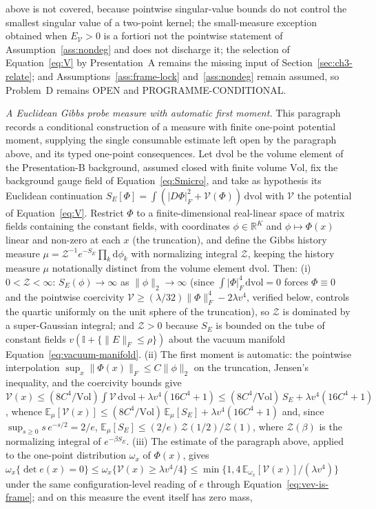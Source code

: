 above is not covered, because pointwise singular-value bounds do not control the smallest singular value of a two-point kernel; the small-measure exception obtained when \(E_{\mathcal V}>0\) is a fortiori not the pointwise statement of Assumption~\ref{ass:nondeg} and does not discharge it; the selection of Equation~\eqref{eq:V} by Presentation~A remains the missing input of Section~\ref{sec:ch3-relate}; and Assumptions~\ref{ass:frame-lock} and~\ref{ass:nondeg} remain assumed, so Problem~D remains OPEN and PROGRAMME-CONDITIONAL.

\emph{A Euclidean Gibbs probe measure with automatic first moment.} This paragraph records a conditional construction of a measure with finite one-point potential moment, supplying the single consumable estimate left open by the paragraph above, and its typed one-point consequences. Let \(\mathrm{dvol}\) be the volume element of the Presentation-B background, assumed closed with finite volume \(\mathrm{Vol}\), fix the background gauge field of Equation~\eqref{eq:Smicro}, and take as hypothesis its Euclidean continuation \(S_E[\Phi]=\int(\lvert D\Phi\rvert_F^2+\mathcal V(\Phi))\,\mathrm{dvol}\) with \(\mathcal V\) the potential of Equation~\eqref{eq:V}. Restrict \(\Phi\) to a finite-dimensional real-linear space of matrix fields containing the constant fields, with coordinates \(\phi\in\mathbb R^K\) and \(\phi\mapsto\Phi(x)\) linear and non-zero at each \(x\) (the truncation), and define the Gibbs history measure \(\mu=\mathcal Z^{-1}e^{-S_E}\prod_k\mathrm d\phi_k\) with normalizing integral \(\mathcal Z\), keeping the history measure \(\mu\) notationally distinct from the volume element \(\mathrm{dvol}\). Then: (i) \(0<\mathcal Z<\infty\): \(S_E(\phi)\to\infty\) as \(\lVert\phi\rVert_2\to\infty\) (since \(\int\lvert\Phi\rvert_F^4\,\mathrm{dvol}=0\) forces \(\Phi\equiv0\) and the pointwise coercivity \(\mathcal V\ge(\lambda/32)\lVert\Phi\rVert_F^4-2\lambda v^4\), verified below, controls the quartic uniformly on the unit sphere of the truncation), so \(\mathcal Z\) is dominated by a super-Gaussian integral; and \(\mathcal Z>0\) because \(S_E\) is bounded on the tube of constant fields \(v(\mathbb I+\{\lVert E\rVert_F\le\rho\})\) about the vacuum manifold Equation~\eqref{eq:vacuum-manifold}. (ii) The first moment is automatic: the pointwise interpolation \(\sup_x\lVert\Phi(x)\rVert_F\le C\lVert\phi\rVert_2\) on the truncation, Jensen's inequality, and the coercivity bounds give \(\mathcal V(x)\le(8C^4/\mathrm{Vol})\int\mathcal V\,\mathrm{dvol}+\lambda v^4(16C^4+1)\le(8C^4/\mathrm{Vol})\,S_E+\lambda v^4(16C^4+1)\), whence \(\mathbb E_\mu[\mathcal V(x)]\le(8C^4/\mathrm{Vol})\,\mathbb E_\mu[S_E]+\lambda v^4(16C^4+1)\) and, since \(\sup_{s\ge0}s\,e^{-s/2}=2/e\), \(\mathbb E_\mu[S_E]\le(2/e)\,\mathcal Z(1/2)/\mathcal Z(1)\), where \(\mathcal Z(\beta)\) is the normalizing integral of \(e^{-\beta S_E}\). (iii) The estimate of the paragraph above, applied to the one-point distribution \(\omega_x\) of \(\Phi(x)\), gives \(\omega_x\{\det e(x)=0\}\le\omega_x\{\mathcal V(x)\ge\lambda v^4/4\}\le\min\{1,4\,\mathbb E_{\omega_x}[\mathcal V(x)]/(\lambda v^4)\}\) under the same configuration-level reading of \(e\) through Equation~\eqref{eq:vev-is-frame}; and on this measure the event itself has zero mass, 